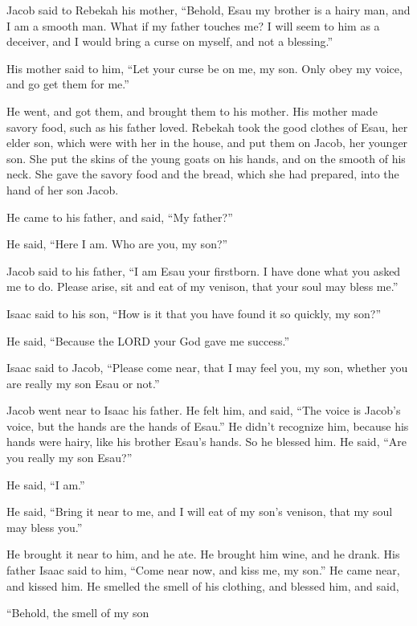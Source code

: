 \myverse{}Jacob said to Rebekah his mother, “Behold, Esau my brother is a hairy man, and I am a smooth man. \myverse{}What if my father touches me? I will seem to him as a deceiver, and I would bring a curse on myself, and not a blessing.”

\myverse{}His mother said to him, “Let your curse be on me, my son. Only obey my voice, and go get them for me.”

\myverse{}He went, and got them, and brought them to his mother. His mother made savory food, such as his father loved. \myverse{}Rebekah took the good clothes of Esau, her elder son, which were with her in the house, and put them on Jacob, her younger son. \myverse{}She put the skins of the young goats on his hands, and on the smooth of his neck. \myverse{}She gave the savory food and the bread, which she had prepared, into the hand of her son Jacob.

\myverse{}He came to his father, and said, “My father?”

He said, “Here I am. Who are you, my son?”

\myverse{}Jacob said to his father, “I am Esau your firstborn. I have done what you asked me to do. Please arise, sit and eat of my venison, that your soul may bless me.”

\myverse{}Isaac said to his son, “How is it that you have found it so quickly, my son?”

He said, “Because the LORD your God gave me success.”

\myverse{}Isaac said to Jacob, “Please come near, that I may feel you, my son, whether you are really my son Esau or not.”

\myverse{}Jacob went near to Isaac his father. He felt him, and said, “The voice is Jacob’s voice, but the hands are the hands of Esau.” \myverse{}He didn’t recognize him, because his hands were hairy, like his brother Esau’s hands. So he blessed him. \myverse{}He said, “Are you really my son Esau?”

He said, “I am.”

\myverse{}He said, “Bring it near to me, and I will eat of my son’s venison, that my soul may bless you.”

He brought it near to him, and he ate. He brought him wine, and he drank. \myverse{}His father Isaac said to him, “Come near now, and kiss me, my son.” \myverse{}He came near, and kissed him. He smelled the smell of his clothing, and blessed him, and said,

“Behold, the smell of my son


